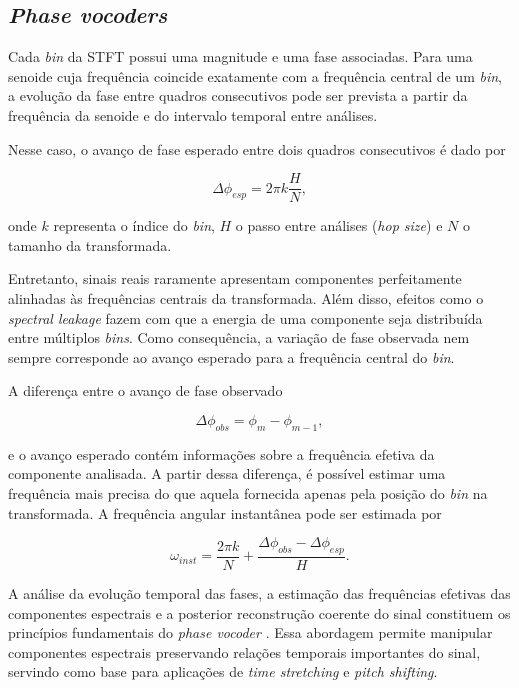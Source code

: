 \subsection{\textit{Phase vocoders}}

Cada \textit{bin} da STFT possui uma magnitude e uma fase associadas. Para uma senoide cuja frequência coincide exatamente com a frequência central de um \textit{bin}, a evolução da fase entre quadros consecutivos pode ser prevista a partir da frequência da senoide e do intervalo temporal entre análises.

Nesse caso, o avanço de fase esperado entre dois quadros consecutivos é dado por

\begin{equation}
\Delta\phi_{esp}
=
2\pi k \frac{H}{N},
\end{equation}

onde \(k\) representa o índice do \textit{bin}, \(H\) o passo entre análises (\textit{hop size}) e \(N\) o tamanho da transformada.

Entretanto, sinais reais raramente apresentam componentes perfeitamente alinhadas às frequências centrais da transformada. Além disso, efeitos como o \textit{spectral leakage} fazem com que a energia de uma componente seja distribuída entre múltiplos \textit{bins}. Como consequência, a variação de fase observada nem sempre corresponde ao avanço esperado para a frequência central do \textit{bin}.

A diferença entre o avanço de fase observado

\begin{equation}
\Delta\phi_{obs}
=
\phi_m - \phi_{m-1},
\end{equation}

e o avanço esperado contém informações sobre a frequência efetiva da componente analisada. A partir dessa diferença, é possível estimar uma frequência mais precisa do que aquela fornecida apenas pela posição do \textit{bin} na transformada. A frequência angular instantânea pode ser estimada \cite{dolson1986} por

\begin{equation}
\omega_{inst}
=
\frac{2\pi k}{N}
+
\frac{\Delta\phi_{obs}-\Delta\phi_{esp}}{H}.
\end{equation}

A análise da evolução temporal das fases, a estimação das frequências efetivas das componentes espectrais e a posterior reconstrução coerente do sinal constituem os princípios fundamentais do \textit{phase vocoder} \cite{flanagan1966,dolson1986}. Essa abordagem permite manipular componentes espectrais preservando relações temporais importantes do sinal, servindo como base para aplicações de \textit{time stretching} e \textit{pitch shifting}.

